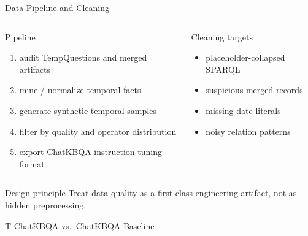 \begin{frame}[shrink=6]{Data Pipeline and Cleaning}
  \begin{columns}[T]
    \begin{block}{Pipeline}
      \small
      \begin{enumerate}
        \item audit TempQuestions and merged artifacts
        \item mine / normalize temporal facts
        \item generate synthetic temporal samples
        \item filter by quality and operator distribution
        \item export ChatKBQA instruction-tuning format
      \end{enumerate}
    \end{block}
    \begin{exampleblock}{Cleaning targets}
      \small
      \begin{itemize}
        \item placeholder-collapsed SPARQL
        \item suspicious merged records
        \item missing date literals
        \item noisy relation patterns
      \end{itemize}
    \end{exampleblock}
  \end{columns}
  \vspace{0.15cm}
  \begin{alertblock}{Design principle}
    Treat data quality as a first-class engineering artifact, not as hidden preprocessing.
  \end{alertblock}
\end{frame}

\begin{frame}[shrink=10]{T-ChatKBQA vs.\ ChatKBQA Baseline}
  \begin{center}
    \vspace{-0.2cm}
    
  \end{center}
\end{frame}

